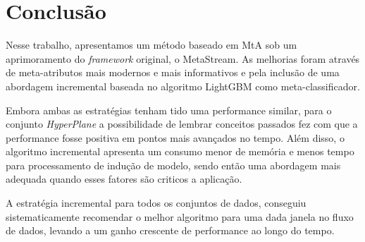 \documentclass[conference,compsoc]{IEEEtran}
\begin{document}
\section{Conclusão}
\label{conclusion}

Nesse trabalho, apresentamos um método baseado em MtA sob um aprimoramento do \textit{framework} original, o MetaStream. As melhorias foram através de meta-atributos mais modernos e mais informativos e pela inclusão de uma abordagem incremental baseada no algoritmo LightGBM como meta-classificador.

Embora ambas as estratégias tenham tido uma performance similar, para o conjunto \textit{HyperPlane} a possibilidade de lembrar conceitos passados fez com que a performance fosse positiva em pontos mais avançados no tempo. Além disso, o algoritmo incremental apresenta um consumo menor de memória e menos tempo para processamento de indução de modelo, sendo então uma abordagem mais adequada quando esses fatores são criticos a aplicação.

A estratégia incremental para todos os conjuntos de dados, conseguiu sistematicamente recomendar o melhor algoritmo para uma dada janela no fluxo de dados, levando a um ganho crescente de performance ao longo do tempo.








\end{document}
